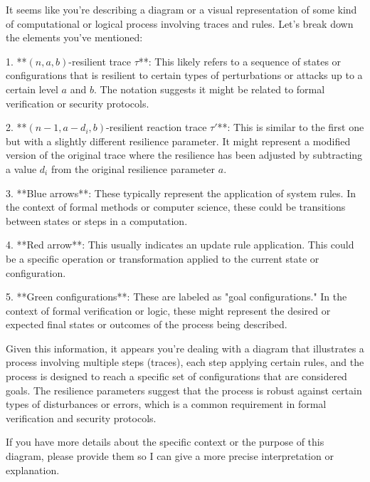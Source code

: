 It seems like you're describing a diagram or a visual representation of some kind of computational or logical process involving traces and rules. Let's break down the elements you've mentioned:

1. **$(n,a,b)$-resilient trace $\tau$**: This likely refers to a sequence of states or configurations that is resilient to certain types of perturbations or attacks up to a certain level $a$ and $b$. The notation suggests it might be related to formal verification or security protocols.

2. **$(n-1,a-d_i,b)$-resilient reaction trace $\tau'$**: This is similar to the first one but with a slightly different resilience parameter. It might represent a modified version of the original trace where the resilience has been adjusted by subtracting a value $d_i$ from the original resilience parameter $a$.

3. **Blue arrows**: These typically represent the application of system rules. In the context of formal methods or computer science, these could be transitions between states or steps in a computation.

4. **Red arrow**: This usually indicates an update rule application. This could be a specific operation or transformation applied to the current state or configuration.

5. **Green configurations**: These are labeled as "goal configurations." In the context of formal verification or logic, these might represent the desired or expected final states or outcomes of the process being described.

Given this information, it appears you're dealing with a diagram that illustrates a process involving multiple steps (traces), each step applying certain rules, and the process is designed to reach a specific set of configurations that are considered goals. The resilience parameters suggest that the process is robust against certain types of disturbances or errors, which is a common requirement in formal verification and security protocols.

If you have more details about the specific context or the purpose of this diagram, please provide them so I can give a more precise interpretation or explanation.